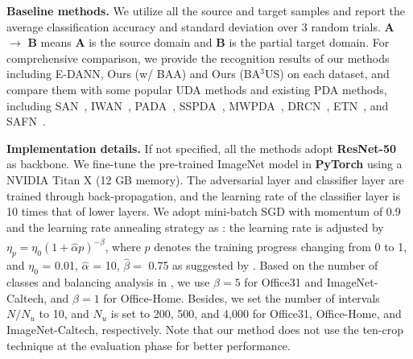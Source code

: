 \documentclass[runningheads]{llncs}
\begin{document}
\textbf{Baseline methods.} We utilize all the source and target samples and report the average classification accuracy and standard deviation over 3 random trials. \textbf{A} $\to$ \textbf{B} means \textbf{A} is the source domain and \textbf{B} is the partial target domain.
For comprehensive comparison, we provide the recognition results of our methods including E-DANN, Ours (w/ BAA) and Ours (BA$^3$US) on each dataset, and compare them with some popular UDA methods \cite{tzeng2017adversarial,long2018conditional} and existing PDA methods, including SAN~\cite{cao2018partialb}, IWAN~\cite{zhang2018importance}, PADA~\cite{cao2018partial}, SSPDA~\cite{bucci2019tackling}, MWPDA~\cite{hu2019multi}, DRCN~\cite{li2020deep}, ETN~\cite{cao2019learning}, and SAFN~\cite{xu2019unsupervised}.
	
	
\textbf{Implementation details.} If not specified, all the methods adopt \textbf{ResNet-50}~\cite{he2016deep} as backbone.
We fine-tune the pre-trained ImageNet model in \textbf{PyTorch} using a {NVIDIA Titan X} (12 GB memory). 
The adversarial layer and classifier layer are trained through back-propagation, and the learning rate of the classifier layer is 10 times that of lower layers.
We adopt mini-batch SGD with momentum of 0.9 and the learning rate annealing strategy as \cite{ganin2016domain,long2018conditional}: the learning rate is adjusted by $\eta_p = \eta_0(1 + \hat{\alpha} p)^{-\hat{\beta}}$, where $p$ denotes the training progress changing from 0 to 1, and $\eta_0$ = 0.01, $\hat{\alpha}$ = 10, $\hat{\beta}=$ 0.75 as suggested by \cite{long2018conditional}. 
Based on the number of classes and balancing analysis in \cite{chen2019complement}, we use $\beta=5$ for Office31 and ImageNet-Caltech, and $\beta=1$ for Office-Home.
Besides, we set the number of intervals $N/N_u$ to 10, and $N_u$ is set to 200, 500, and 4,000 for Office31, Office-Home, and ImageNet-Caltech, respectively.
Note that our method does not use the ten-crop technique \cite{cao2018partial,long2018conditional} at the evaluation phase for better performance.
\end{document}
